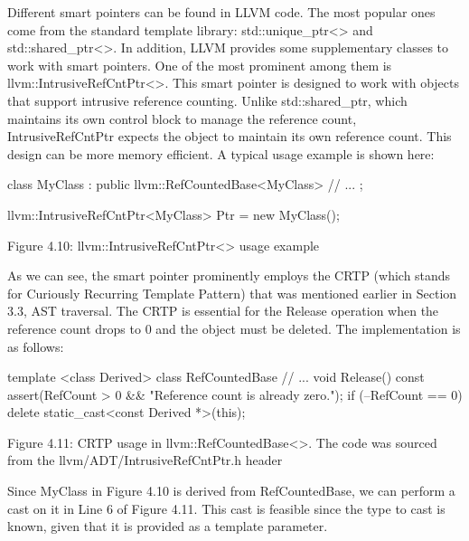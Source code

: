 Different smart pointers can be found in LLVM code. The most popular ones come from the standard template library: std::unique\_ptr<> and std::shared\_ptr<>. In addition, LLVM provides some supplementary classes to work with smart pointers. One of the most prominent among them is llvm::IntrusiveRefCntPtr<>. This smart pointer is designed to work with objects that support intrusive reference counting. Unlike std::shared\_ptr, which maintains its own control block to manage the reference count, IntrusiveRefCntPtr expects the object to maintain its own reference count. This design can be more memory efficient. A typical usage example is shown here:

\begin{cpp}
class MyClass : public llvm::RefCountedBase<MyClass> {
  // ...
};

llvm::IntrusiveRefCntPtr<MyClass> Ptr = new MyClass();
\end{cpp}

\begin{center}
Figure 4.10: llvm::IntrusiveRefCntPtr<> usage example
\end{center}

As we can see, the smart pointer prominently employs the CRTP (which stands for Curiously Recurring Template Pattern) that was mentioned earlier in Section 3.3, AST traversal. The CRTP is essential for the Release operation when the reference count drops to 0 and the object must be deleted. The implementation is as follows:

\begin{cpp}
template <class Derived> class RefCountedBase {
  // ...
  void Release() const {
    assert(RefCount > 0 && "Reference count is already zero.");
    if (--RefCount == 0)
      delete static_cast<const Derived *>(this);
  }
}
\end{cpp}

\begin{center}
Figure 4.11: CRTP usage in llvm::RefCountedBase<>. The code was sourced from the llvm/ADT/IntrusiveRefCntPtr.h header
\end{center}

Since MyClass in Figure 4.10 is derived from RefCountedBase, we can perform a cast on it in Line 6 of Figure 4.11. This cast is feasible since the type to cast is known, given that it is provided as a template parameter.

